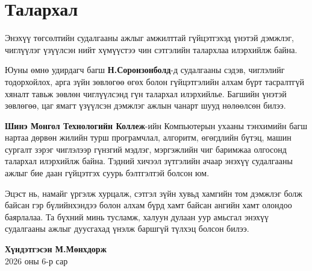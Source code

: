 
\chapter*{Талархал}
\thispagestyle{empty}

Энэхүү төгсөлтийн судалгааны ажлыг амжилттай гүйцэтгэхэд үнэтэй дэмжлэг, чиглүүлэг үзүүлсэн нийт хүмүүстээ чин сэтгэлийн талархлаа илэрхийлж байна.

Юуны өмнө удирдагч багш \textbf{Н.Соронзонболд}-д судалгааны сэдэв, чиглэлийг тодорхойлох, арга зүйн зөвлөгөө өгөх болон гүйцэтгэлийн алхам бүрт тасралтгүй хяналт тавьж зөвлөн чиглүүлсэнд гүн талархал илэрхийлье. Багшийн үнэтэй зөвлөгөө, цаг ямагт үзүүлсэн дэмжлэг ажлын чанарт шууд нөлөөлсөн билээ.

\textbf{Шинэ Монгол Технологийн Коллеж}-ийн Компьютерын ухааны тэнхимийн багш нартаа дөрвөн жилийн турш програмчлал, алгоритм, өгөгдлийн бүтэц, машин сургалт зэрэг чиглэлээр гүнзгий мэдлэг, мэргэжлийн чиг баримжаа олгосонд талархал илэрхийлж байна. Тэдний хичээл зүтгэлийн ачаар энэхүү судалгааны ажлыг бие даан гүйцэтгэх суурь бэлтгэлтэй болсон юм.

Эцэст нь, намайг үргэлж хурцалж, сэтгэл зүйн хувьд хамгийн том дэмжлэг болж байсан гэр бүлийнхэндээ болон алхам бүрд хамт байсан ангийн хамт олондоо баярлалаа. Та бүхний минь тусламж, халуун дулаан уур амьсгал энэхүү судалгааны ажлыг дуусгахад үнэлж баршгүй түлхэц болсон билээ.

\vspace{15mm}
\begin{flushright}
\textbf{Хүндэтгэсэн М.Мөнхдорж}\\
2026 оны 6-р сар
\end{flushright}
